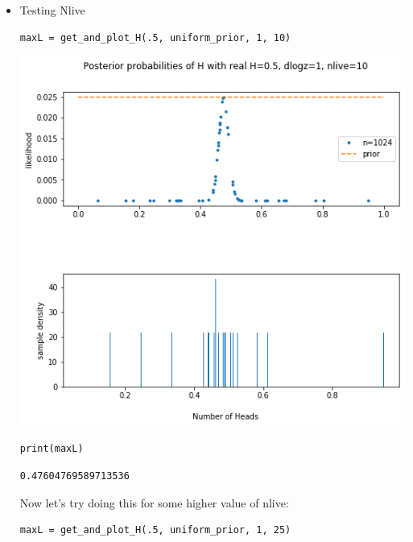 \documentclass[11pt]{article}
\begin{document}
\begin{itemize}
\item Testing Nlive
\label{sec-1-3-1-1}

\begin{verbatim}
maxL = get_and_plot_H(.5, uniform_prior, 1, 10)
\end{verbatim}

\includegraphics[width=.9\linewidth]{./obipy-resources/692Tys.png}

\begin{verbatim}
print(maxL)
\end{verbatim}

\begin{verbatim}
0.47604769589713536
\end{verbatim}

Now let's try doing this for some higher value of nlive:

\begin{verbatim}
maxL = get_and_plot_H(.5, uniform_prior, 1, 25)
\end{verbatim}


\end{itemize}
\end{document}
